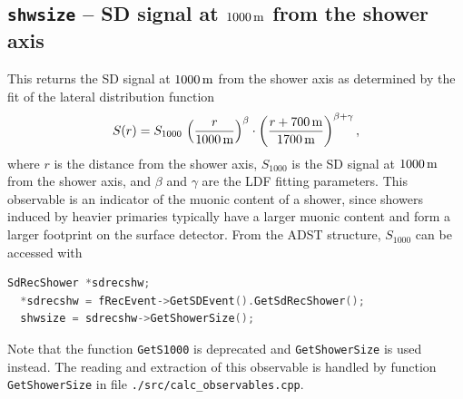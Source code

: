 \documentclass[12pt,a4paper]{report}
\begin{document}
\subsection{\texttt{shwsize} -- SD signal at $\unit[1000]{m}$ from the shower axis}
This returns the SD signal at $\unit[1000]{m}$ from the shower axis as determined by the fit of the lateral distribution function
\begin{equation} \label{eq:ldfFunction}
S(r) = S_{1000}\, \left(\frac{r}{\unit[1000]{m}}\right)^{\beta}\cdot \left(\frac{r + \unit[700]{m}}{\unit[1700]{m}}\right)^{\beta + \gamma},
\end{equation}
where $r$ is the distance from the shower axis, $S_{1000}$ is the SD signal at $\unit[1000]{m}$ from the shower axis, and $\beta$ and $\gamma$ are the LDF fitting parameters. This observable is an indicator of the muonic content of a shower, since showers induced by heavier primaries typically have a larger muonic content and form a larger footprint on the surface detector. From the ADST structure, $S_{1000}$ can be accessed with
\begin{lstlisting}[language=C++]
  SdRecShower *sdrecshw;
  *sdrecshw = fRecEvent->GetSDEvent().GetSdRecShower();
  shwsize = sdrecshw->GetShowerSize();
\end{lstlisting}
Note that the function \texttt{GetS1000} is deprecated and \texttt{GetShowerSize} is used instead. The reading and extraction of this observable is handled by function \texttt{GetShowerSize} in file \texttt{./src/calc\_observables.cpp}.
\end{document}
